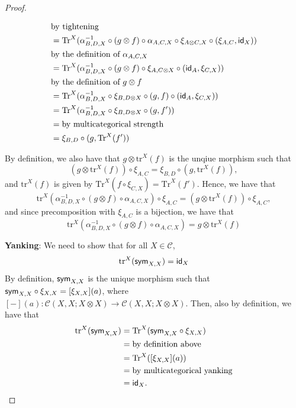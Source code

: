 \begin{example}
\begin{proof}
\begin{itemize}
\begin{align*}
     &\text{by tightening}\\
     &= \text{Tr}^{X}(\alpha^{-1}_{B,D,X} \circ (g \otimes f) \circ \alpha_{A,C,X} \circ \xi_{A \otimes C, X} \circ (\xi_{A,C}, \textsf{id}_{X}))\\
     &\text{by the definition of $\alpha_{A,C,X}$}\\
     &=\text{Tr}^{X}(\alpha^{-1}_{B,D,X} \circ (g \otimes f) \circ \xi_{A, C \otimes X} \circ (\textsf{id}_{A}, \xi_{C,X}))\\
     &\text{by the definition of $g \otimes f$}\\
     &=\text{Tr}^{X}(\alpha^{-1}_{B,D,X} \circ \xi_{B,D \otimes X} \circ (g , f) \circ (\textsf{id}_{A}, \xi_{C,X}))\\
     &=\text{Tr}^{X}(\alpha^{-1}_{B,D,X} \circ \xi_{B,D \otimes X} \circ (g , f'))\\
     &=\text{by multicategorical strength}\\
     &=\xi_{B,D} \circ (g,\text{Tr}^{X}(f'))\\
    \end{align*}
  \end{itemize}
  By definition, we also have that $g \otimes \text{tr}^{X}(f)$ is the unqiue morphism such that
  \[
  (g \otimes \text{tr}^{X}(f)) \circ \xi_{A,C} = \xi_{B,D} \circ (g, \text{tr}^{X}(f)),
  \]
  and $\text{tr}^{X}(f)$ is given by $\text{Tr}^{X}(f \circ \xi_{C,X}) = \text{Tr}^{X}(f')$.
  Hence, we have that
  \[
  \text{tr}^{X}(\alpha^{-1}_{B,D,X} \circ (g \otimes f) \circ \alpha_{A,C,X}) \circ \xi_{A,C} = (g \otimes \text{tr}^{X}(f)) \circ \xi_{A,C}, 
  \]
  and since precomposition with $\xi_{A,C}$ is a bijection, we have that
  \[
   \text{tr}^{X}(\alpha^{-1}_{B,D,X} \circ (g \otimes f) \circ \alpha_{A,C,X}) = g \otimes \text{tr}^{X}(f)
  \]
  \item \textbf{Yanking}: We need to show that for all $X \in \mathcal{C}$,
  \[
  \text{tr}^{X}(\textsf{sym}_{X,X}) = \textsf{id}_{X}
  \]
  By definition, $\textsf{sym}_{X,X}$ is the unique morphism such that $\textsf{sym}_{X,X} \circ \xi_{X,X} = [\xi_{X,X}](a)$, where $[-](a) : \mathcal{C}(X,X; X \otimes X) \to \mathcal{C}(X,X; X \otimes X)$.
  Then, also by definition, we have that
  \begin{align*}
    \text{tr}^{X}(\textsf{sym}_{X,X}) &= \text{Tr}^{X}(\textsf{sym}_{X,X} \circ \xi_{X,X})\\
    &=\text{by definition above}\\
    &=\text{Tr}^{X}([\xi_{X,X}](a))\\
    &=\text{by multicategorical yanking}\\
    &= \textsf{id}_{X}.
  \end{align*}
\end{proof}


\end{example}

